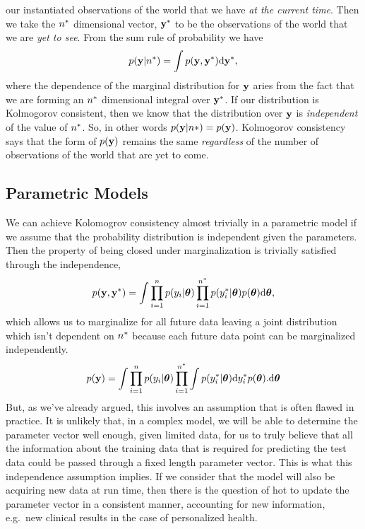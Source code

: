 \documentclass[a4paperpaper,]{article}
\begin{document}
our instantiated observations of the world that we have \emph{at the
current time}. Then we take the \(n^*\) dimensional vector,
\(\mathbf{ y}^*\) to be the observations of the world that we are
\emph{yet to see}. From the sum rule of probability we have
\begin{align*} 
p(\mathbf{ y}|n^*) = \int p(\mathbf{ y}, \mathbf{ y}^*) \text{d}\mathbf{ y}^*,
\end{align*} where the dependence of the marginal distribution for
\(\mathbf{ y}\) aries from the fact that we are forming an
\(n^*\) dimensional integral over \(\mathbf{ y}^*\). If our
distribution is Kolmogorov consistent, then we know that the
distribution over \(\mathbf{ y}\) is \emph{independent} of the value of
\(n^*\). So, in other words
\(p(\mathbf{ y}|n*)=p(\mathbf{ y})\). Kolmogorov consistency says
that the form of \(p(\mathbf{ y})\) remains the same \emph{regardless}
of the number of observations of the world that are yet to come.

\hypertarget{parametric-models}{%
\subsection{Parametric Models}\label{parametric-models}}

We can achieve Kolomogrov consistency almost trivially in a parametric
model if we assume that the probability distribution is independent
given the parameters. Then the property of being closed under
marginalization is trivially satisfied through the independence,
\begin{align*}
p(\mathbf{ y}, \mathbf{ y}^*) = \int\prod_{i=1}^n p(y_{i} |
\boldsymbol{\theta})\prod_{i=1}^{n^*}p(y^*_i|\boldsymbol{\theta})
p(\boldsymbol{ \theta}) \text{d}\boldsymbol{ \theta},
\end{align*} which allows us to marginalize for all future data leaving
a joint distribution which isn't dependent on \(n^*\) because
each future data point can be marginalized independently. \begin{align*}
p(\mathbf{ y}) = \int \prod_{i=1}^n
p(y_{i} |
\boldsymbol{\theta})\prod_{i=1}^{n^*} \int
p(y^*_i|\boldsymbol{\theta})
\text{d}y^*_i p(\boldsymbol{ \theta}).
\text{d}\boldsymbol{ \theta}
\end{align*} But, as we've already argued, this involves an assumption
that is often flawed in practice. It is unlikely that, in a complex
model, we will be able to determine the parameter vector well enough,
given limited data, for us to truly believe that all the information
about the training data that is required for predicting the test data
could be passed through a fixed length parameter vector. This is what
this independence assumption implies. If we consider that the model will
also be acquiring new data at run time, then there is the question of
hot to update the parameter vector in a consistent manner, accounting
for new information, e.g.~new clinical results in the case of
personalized health.
\end{document}

